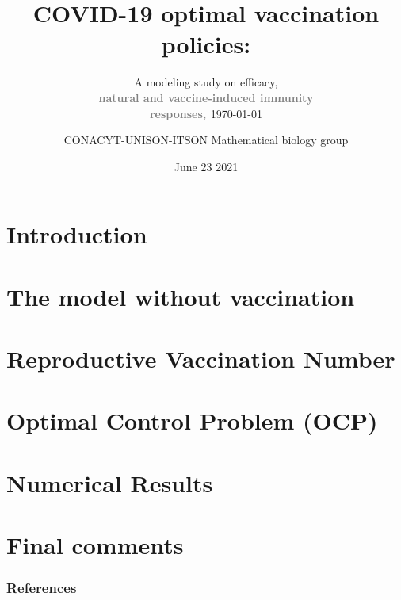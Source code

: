 \documentclass[9pt]{beamer}
\title{\Huge{COVID-19 optimal vaccination policies:}}
\subtitle{%
    \huge{A modeling study on efficacy,}
    \\
    \huge{
        \textbf{
            \textcolor{gray}{
                 natural and vaccine-induced immunity%
            }
        }
    }
    \\
    \huge{
        \textbf{
            \textcolor{gray}{
                 responses,%
            }
        }
    } \normalsize{\today}
}
\author{
    \normalsize{CONACYT-UNISON-ITSON Mathematical biology group}
}
\date{June 23 2021}
\begin{document}
    \titlepage
    \section*{Introduction}
        
    \section{The model without vaccination}
        
    \section{Reproductive Vaccination Number}
        
    \section{Optimal Control Problem (OCP)}
        
    \section{Numerical Results}
        
        
        
        
    \section{Final comments}
        
    \begin{frame}[allowframebreaks]
        \frametitle{References}
        
        
    \end{frame}
\end{document}
